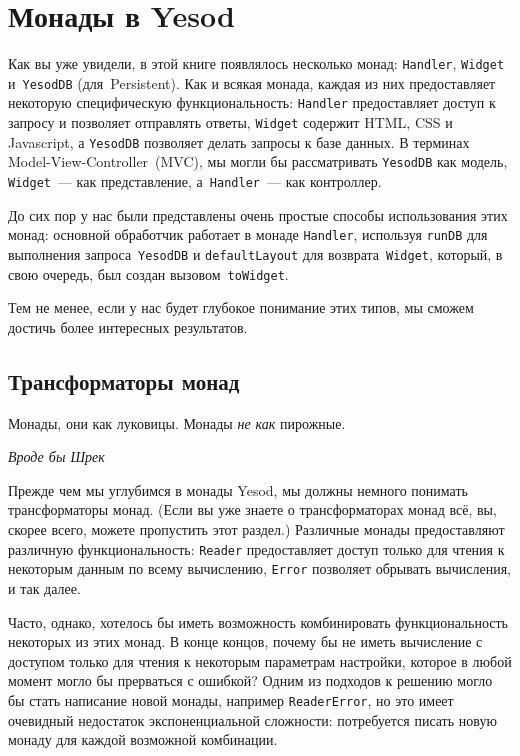 \chapter{Монады в Yesod}\label{chap:yesod_monads}

Как вы уже увидели, в этой книге появлялось несколько монад:
\lstinline'Handler', \lstinline'Widget' и~\lstinline'YesodDB' (для~Persistent).
Как и всякая монада, каждая из них предоставляет некоторую специфическую
функциональность: \lstinline'Handler' предоставляет доступ к запросу и позволяет
отправлять ответы, \lstinline'Widget' содержит HTML, CSS и Javascript, а
\lstinline'YesodDB' позволяет делать запросы к базе данных. В терминах
Model-View-Controller~(MVC), мы могли бы рассматривать \lstinline'YesodDB' как
модель, \lstinline'Widget'~--- как представление, а~\lstinline'Handler'~--- как
контроллер.

До сих пор у нас были представлены очень простые способы использования этих
монад: основной обработчик работает в монаде \lstinline'Handler', используя
\lstinline'runDB' для выполнения запроса~\lstinline'YesodDB' и
\lstinline'defaultLayout' для возврата~\lstinline'Widget', который, в свою
очередь, был создан вызовом~\lstinline'toWidget'.

Тем не менее, если у нас будет глубокое понимание этих типов, мы сможем достичь
более интересных результатов.

\section{Трансформаторы монад}
\hfill \begin{minipage}[h]{0.45\textwidth}
    \small
    Монады, они как луковицы. Монады \emph{не как} пирожные.
    \begin{flushright}
        \emph{Вроде бы Шрек}
    \end{flushright}
\end{minipage}
\vspace{2em}

Прежде чем мы углубимся в монады Yesod, мы должны немного понимать
трансформаторы монад.  (Если вы уже знаете о трансформаторах монад всё, вы,
скорее всего, можете пропустить этот раздел.) Различные монады предоставляют
различную функциональность: \lstinline'Reader' предоставляет доступ только для
чтения к некоторым данным по всему вычислению, \lstinline'Error' позволяет
обрывать вычисления, и так далее.

Часто, однако, хотелось бы иметь возможность комбинировать функциональность
некоторых из этих монад. В конце концов, почему бы не иметь вычисление с
доступом только для чтения к некоторым параметрам настройки, которое в любой
момент могло бы прерваться с ошибкой? Одним из подходов к решению могло бы стать
написание новой монады, например \lstinline'ReaderError', но это имеет очевидный
недостаток экспоненциальной сложности: потребуется писать новую монаду для
каждой возможной комбинации.

